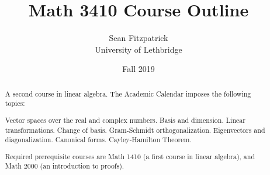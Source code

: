 \documentclass[oneside,10pt,]{article}
\title{Math 3410 Course Outline}
\author{Sean Fitzpatrick\\
University of Lethbridge
}
\date{Fall 2019}
\begin{document}
\hypertarget{x:article:linalg-outline-2019}{}
\maketitle
\thispagestyle{empty}
\begin{abstract}
A second course in linear algebra. The Academic Calendar imposes the following topics:%
\par
Vector spaces over the real and complex numbers. Basis and dimension. Linear transformations. Change of basis. Gram-Schmidt orthogonalization. Eigenvectors and diagonalization. Canonical forms. Cayley-Hamilton Theorem.%
\par
Required prerequisite courses are Math 1410 (a first course in linear algebra), and Math 2000 (an introduction to proofs).%
\end{abstract}
%
%
\typeout{************************************************}
\typeout{************************************************}
%
\end{document}
